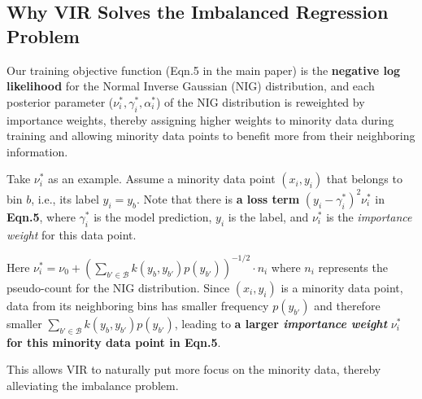 \subsection{Why VIR Solves the Imbalanced Regression Problem}
{Our training objective function (Eqn.5 in the main paper) is the \textbf{negative log likelihood} for the Normal Inverse Gaussian (NIG) distribution, and each posterior parameter ($\nu_i^*, \gamma_i^*,  \alpha_i^*$) of the NIG distribution is reweighted by importance weights, thereby assigning higher weights to minority data during training and allowing minority data points to benefit more from their neighboring information.}

{Take $\nu_i^*$ as an example. Assume a minority data point $(x_i,y_i)$ that belongs to bin $b$, i.e., its label $y_i=y_b$. Note that there is \textbf{a loss term} $(y_i-\gamma_i^*)^2\nu_i^*$ in \textbf{Eqn.5}, where $\gamma_i^*$ is the model prediction, $y_i$ is the label, and $\nu^{*}_{i}$ is the \emph{importance weight} for this data point.}

{Here $\nu_i^* = \nu_0 + (\sum_{b' \in \mathcal{B}} k (y_b, y_{b'}) p(y_{b'}))^{-1/2} \cdot n_i$ where $n_i$ represents the pseudo-count for the NIG distribution. Since $(x_i,y_i)$ is a minority data point, data from its neighboring bins has smaller frequency $p(y_{b'})$ and therefore smaller $\sum_{b' \in \mathcal{B}} k (y_{b}, y_{b'}) p(y_{b'})$, leading to \textbf{a larger \emph{importance weight}} $\nu_i^*$ \textbf{for this minority data point in Eqn.5}. }

{This allows VIR to naturally put more focus on the minority data, thereby alleviating the imbalance problem.} 

